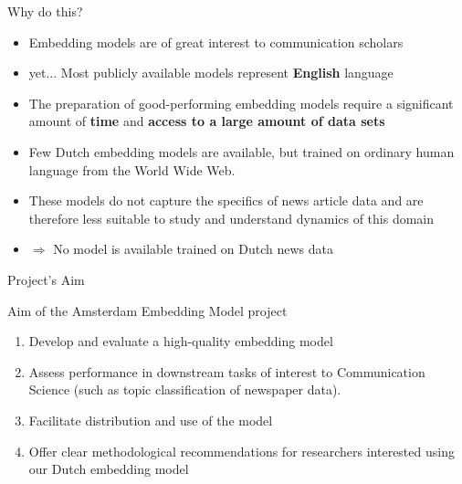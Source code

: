 \begin{frame}{Why do this?}
	\begin{itemize}
		\item Embedding models are of great interest to communication scholars
		\item yet... Most publicly available models represent \textbf{English} language
		\item The preparation of good-performing embedding models require a significant amount of \textbf{time} and \textbf{access to a large amount of data sets}
		\item Few Dutch embedding models are available, but trained on ordinary human language from the World Wide Web.
		\item These models do not capture the specifics of news article data and are therefore less suitable to study and understand dynamics of this domain
		\item $\Rightarrow$ No model is available trained on Dutch news data
	\end{itemize}
\end{frame}


\begin{frame}{Project's Aim}
	\begin{block}{Aim of the Amsterdam Embedding Model project} 
		\begin{enumerate}
			\item Develop and evaluate a high-quality embedding model
			\item Assess performance in downstream tasks of interest to Communication Science (such as topic classification of newspaper data).
			\item Facilitate distribution and use of the model
			\item Offer clear methodological recommendations for researchers interested using our Dutch embedding model
		\end{enumerate}
	\end{block}
\end{frame}

